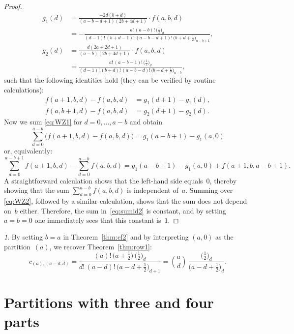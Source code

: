 \documentclass{mathincs}
\numberwithin{equation}{section}
\numberwithin{figure}{section}
\theoremstyle{plain}
\theoremstyle{definition}
\theoremstyle{remark}
\newtheorem{rem}[thm]{\protect\remarkname}
\theoremstyle{plain}
\theoremstyle{definition}
\theoremstyle{plain}
\theoremstyle{plain}
\providecommand{\remarkname}{Remark}
\begin{document}
\begin{proof}
  \begin{align*}
    g_1(d) &= \frac{-2d(b+d)}{(a-b-d+1)(2b+4d+1)}\cdot f(a,b,d) \\
    &= -\frac{a! \, (a-b)! \, \bigl(\frac12\bigr)_{\!d}}{(d-1)! \, (b+d-1)! \, (a-b-d+1)! \, \bigl(b+d+\frac12\bigr)_{\!a-b+1}}, \\
    g_2(d) &= \frac{d(2a+2d+1)}{(a-b)(2b+4d+1)} \cdot f(a,b,d) \\
    &= \frac{a! \, (a-b-1)! \, \bigl(\frac12\bigr)_{\!d}}{(d-1)! \, (b+d)! \, (a-b-d)! \, \bigl(b+d+\frac12\bigr)_{\!a-b}},
  \end{align*}
  such that the following identities hold (they can be verified by routine
  calculations):
  \begin{align}
    f(a+1,b,d)-f(a,b,d) &= g_1(d+1) - g_1(d), \label{eq:WZ1} \\
    f(a,b+1,d)-f(a,b,d) &= g_2(d+1) - g_2(d). \label{eq:WZ2}
  \end{align}
  Now we sum \eqref{eq:WZ1} for $d=0,\dots,a-b$ and obtain
  \[
    \sum_{d=0}^{a-b}\bigl(f(a+1,b,d)-f(a,b,d)\bigr) = g_1(a-b+1) - g_1(a,0)
  \]
  or, equivalently:
  \[
    \sum_{d=0}^{a-b+1}f(a+1,b,d) - \sum_{d=0}^{a-b}f(a,b,d) = g_1(a-b+1) - g_1(a,0) + f(a+1,b,a-b+1).
  \]
  A straightforward calculation shows that the left-hand side equals~$0$,
  thereby showing that the sum $\sum_{d=0}^{a-b}f(a,b,d)$ is independent
  of~$a$. Summing over \eqref{eq:WZ2}, followed by a similar calculation,
  shows that the sum does not depend on~$b$ either. Therefore, the sum
  in~\eqref{eq:sumid2} is constant, and by setting $a=b=0$ one immediately
  sees that this constant is~$1$.
\end{proof}

\begin{rem}
  By setting $b=a$ in Theorem~\ref{thm:cf2} and by interpreting $(a,0)$ as the
  partition~$(a)$, we recover Theorem~\ref{thm:row1}:
  \[
    c_{(a),(a-d,d)} = 
    \frac{(a)! \, \bigl(a+\frac12\bigr) \, \bigl(\frac12\bigr)_{\!d}}
         {d! \, (a-d)! \, \bigl(a-d+\frac12\bigr)_{\!d+1}} =
    \binom{a}{d} \, \frac{\bigl(\frac12\bigr)_{\!d}}{\bigl(a-d+\frac12\bigr)_{\!d}}.
  \]
\end{rem}



\section{Partitions with three and four parts}\label{sec:3+4parts}
\end{document}
